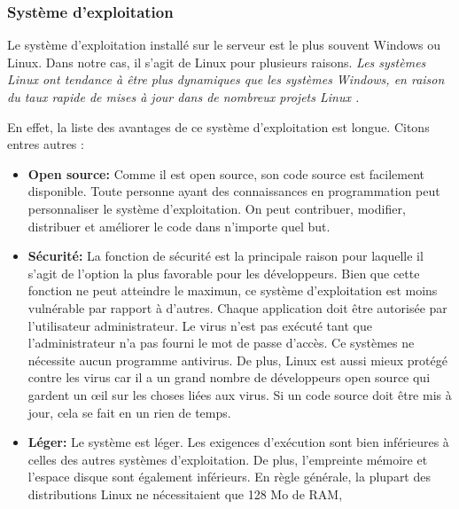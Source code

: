         \subsubsection{Système d'exploitation}
        Le système d'exploitation installé sur le serveur est le plus souvent Windows ou Linux.
        Dans notre cas, il s'agit de Linux pour plusieurs raisons.
        \textit{Les systèmes Linux ont tendance à être plus dynamiques que les 
        systèmes Windows, en raison du taux rapide de mises à jour  
        dans de nombreux projets Linux \cite{ovadia2014linux}.}
        \par
        En effet, la liste des avantages de ce système d'exploitation
        est longue. Citons entres autres \cite{advlinux} :
        \begin{itemize}
                \item \textbf{Open source: }
                Comme il est open source, son code source est facilement disponible. 
                Toute personne ayant des connaissances en programmation peut personnaliser 
                le système d'exploitation. On peut contribuer, modifier, distribuer et 
                améliorer le code dans n'importe quel but.
                \item \textbf{Sécurité: }
                La fonction de sécurité est la principale raison pour laquelle il s'agit de  
                l'option la plus favorable pour les développeurs. Bien que cette fonction ne peut atteindre 
                le maximun, ce système d'exploitation est moins vulnérable par rapport à
                 d'autres. Chaque application doit 
                être autorisée par l'utilisateur administrateur. Le virus n'est pas exécuté 
                tant que l'administrateur n'a pas fourni le mot de passe d'accès. Ce systèmes 
                ne nécessite aucun programme antivirus.
                De plus, Linux est aussi mieux protégé contre les virus car il a un grand 
                nombre de développeurs open source qui gardent un œil sur les choses liées aux 
                virus. Si un code source doit être mis à jour, cela se fait en un rien de temps.
                \item \textbf{Léger: }
                Le système est léger. Les exigences d'exécution sont bien inférieures à 
                celles des autres systèmes d'exploitation. De plus, l'empreinte mémoire et 
                l'espace disque sont également inférieurs. En règle générale, 
                la plupart des distributions Linux ne nécessitaient que 128 Mo de RAM, 

\end{itemize}
